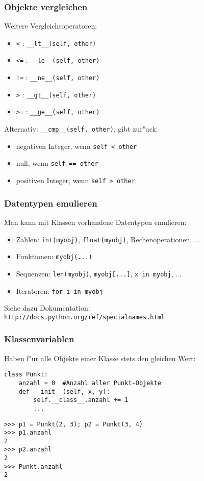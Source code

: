 \begin{frame}[fragile]
\frametitle{Objekte vergleichen}
Weitere Vergleichsoperatoren:
\begin{itemize}
\item \texttt{<} : \lstinline{__lt__(self, other)}
\item \texttt{<=} : \lstinline{__le__(self, other)}
\item \texttt{!=} : \lstinline{__ne__(self, other)}
\item \texttt{>} : \lstinline{__gt__(self, other)}
\item \texttt{>=} : \lstinline{__ge__(self, other)}
\end{itemize}
\vspace{2mm}
Alternativ: \lstinline{__cmp__(self, other)}, gibt zur"uck:
\begin{itemize}
\item negativen Integer, wenn \lstinline{self < other}
\item null, wenn \lstinline{self == other}
\item positiven Integer, wenn \lstinline{self > other}
\end{itemize}
\end{frame}

\begin{frame}
\frametitle{Datentypen emulieren}
Man kann mit Klassen vorhandene Datentypen emulieren:
\begin{itemize}
\item Zahlen: \texttt{int(myobj)}, \texttt{float(myobj)}, Rechenoperationen, ...
\item Funktionen: \texttt{myobj(...)}
\item Sequenzen: \texttt{len(myobj)}, \texttt{myobj[...]}, \lstinline{x in myobj}, ...
\item Iteratoren: \lstinline{for i in myobj}
\end{itemize}
\vspace{2mm}
Siehe dazu Dokumentation:\\
\alert{\texttt{http://docs.python.org/ref/specialnames.html}}
\end{frame}

\begin{frame}[fragile]
\frametitle{Klassenvariablen}
Haben f"ur alle Objekte einer Klasse stets den gleichen Wert:
\begin{lstlisting}[style=Python]
class Punkt:
    anzahl = 0  #Anzahl aller Punkt-Objekte
    def __init__(self, x, y):
        self.__class__.anzahl += 1
        ...
\end{lstlisting}
\begin{lstlisting}[style=Shell]
>>> p1 = Punkt(2, 3); p2 = Punkt(3, 4)
>>> p1.anzahl
2
>>> p2.anzahl
2
>>> Punkt.anzahl
2
\end{lstlisting}
\end{frame}

